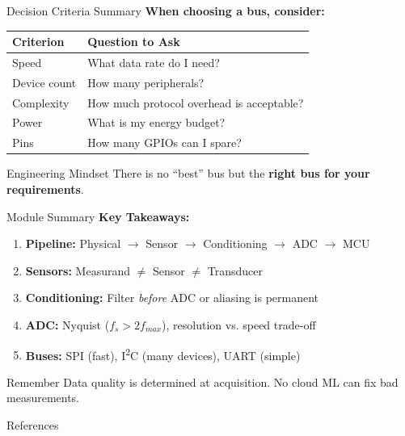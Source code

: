 \documentclass[aspectratio=169,11pt]{beamer}
\begin{document}
\begin{frame}{Decision Criteria Summary}
    \textbf{When choosing a bus, consider:}
    
    \vspace{0.5cm}
    \begin{table}
        \centering
        \begin{tabular}{ll}
            \toprule
            \textbf{Criterion} & \textbf{Question to Ask} \\
            \midrule
            Speed & What data rate do I need? \\
            Device count & How many peripherals? \\
            Complexity & How much protocol overhead is acceptable? \\
            Power & What is my energy budget? \\
            Pins & How many GPIOs can I spare? \\
            \bottomrule
        \end{tabular}
    \end{table}
    
    \vspace{0.3cm}
    \begin{block}{Engineering Mindset}
        There is no ``best'' bus but the \textbf{right bus for your requirements}.
    \end{block}
\end{frame}


\begin{frame}{Module Summary}
    \textbf{Key Takeaways:}
    
    \vspace{0.3cm}
    \begin{enumerate}
        \item \textbf{Pipeline:} Physical $\rightarrow$ Sensor $\rightarrow$ Conditioning $\rightarrow$ ADC $\rightarrow$ MCU
        \item \textbf{Sensors:} Measurand $\neq$ Sensor $\neq$ Transducer
        \item \textbf{Conditioning:} Filter \textit{before} ADC or aliasing is permanent
        \item \textbf{ADC:} Nyquist ($f_s > 2f_{max}$), resolution vs. speed trade-off
        \item \textbf{Buses:} SPI (fast), I\textsuperscript{2}C (many devices), UART (simple)
    \end{enumerate}
    
    \vspace{0.3cm}
    \begin{alertblock}{Remember}
        Data quality is determined at acquisition. No cloud ML can fix bad measurements.
    \end{alertblock}
\end{frame}


\begin{frame}[allowframebreaks]{References}
    \printbibliography
\end{frame}
\end{document}
